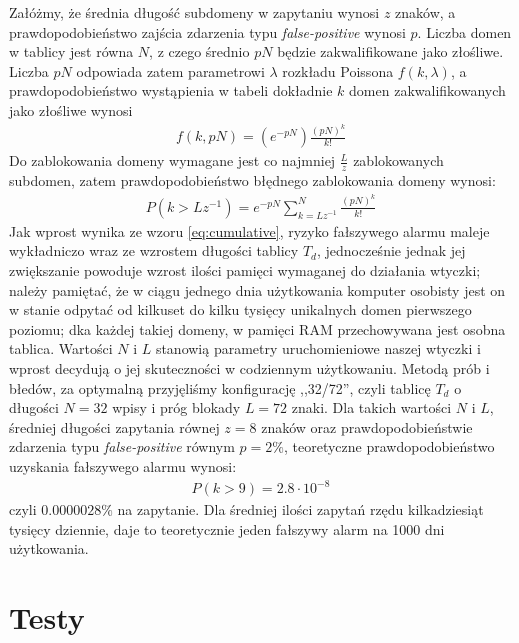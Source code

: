 \documentclass{eiti-raport}
\begin{document}
Załóżmy, że średnia długość subdomeny w zapytaniu wynosi $z$ znaków, a prawdopodobieństwo zajścia zdarzenia typu \emph{false-positive} wynosi $p$. Liczba domen w tablicy jest równa $N$, z czego średnio $pN$ będzie zakwalifikowane jako złośliwe. Liczba $pN$ odpowiada zatem parametrowi $\lambda$ rozkładu Poissona $f(k,\lambda)$, a prawdopodobieństwo wystąpienia w tabeli dokładnie $k$ domen zakwalifikowanych jako złośliwe wynosi 
\begin{align}
f(k,pN) = \left( e^{-pN} \right) \frac{ \left( pN \right)^k }{k!}
\end{align}
Do zablokowania domeny wymagane jest co najmniej $\frac{L}{z}$ zablokowanych subdomen, zatem prawdopodobieństwo błędnego zablokowania domeny wynosi:
\begin{align} \label{eq:cumulative}
P\left( k > Lz^{-1} \right) = e^{-pN} \sum_{k = Lz^{-1}}^{N} \frac{ \left( pN \right)^k }{k!}
\end{align}
Jak wprost wynika ze wzoru \ref{eq:cumulative}, ryzyko fałszywego alarmu maleje wykładniczo wraz ze wzrostem długości tablicy $T_d$, jednocześnie jednak jej zwiększanie powoduje wzrost ilości pamięci wymaganej do działania wtyczki; należy pamiętać, że w ciągu jednego dnia użytkowania komputer osobisty jest on w stanie odpytać od kilkuset do kilku tysięcy unikalnych domen pierwszego poziomu; dka każdej takiej domeny, w pamięci RAM przechowywana jest osobna tablica. Wartości $N$ i $L$ stanowią parametry uruchomieniowe naszej wtyczki i wprost decydują o jej skuteczności w codziennym użytkowaniu. Metodą prób i błedów, za optymalną przyjęliśmy konfigurację ,,32/72'', czyli tablicę $T_d$ o długości $N = 32$ wpisy i próg blokady $L = 72$ znaki. Dla takich wartości $N$ i $L$, średniej długości zapytania równej $z = 8$ znaków oraz prawdopodobieństwie zdarzenia typu \emph{false-positive} równym $p = 2\%$, teoretyczne prawdopodobieństwo uzyskania fałszywego alarmu wynosi:
\begin{align*}
P \left( k > 9 \right) = 2.8 \cdot 10^{-8}
\end{align*}
czyli $0.0000028\%$ na zapytanie. Dla średniej ilości zapytań rzędu kilkadziesiąt tysięcy dziennie, daje to teoretycznie jeden fałszywy alarm na 1000 dni użytkowania. 

\section{Testy}
\end{document}

